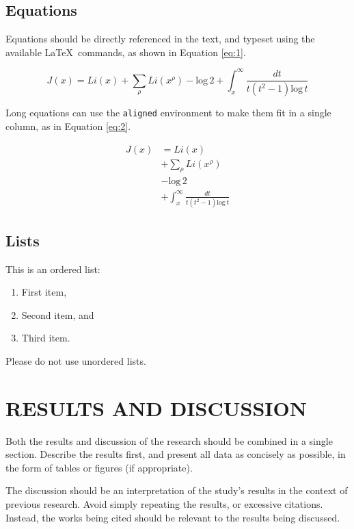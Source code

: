 \documentclass[twocolumn,twoside]{base/jrekpros}
\begin{document}
\subsection{Equations}

Equations should be directly referenced in the text, and typeset using the available \LaTeX\, commands, as shown in Equation \ref{eq:1}.

\begin{equation}
    J(x) = Li(x) + \sum_\rho Li(x^\rho) - \text{log}\,2 + \int^\infty_x \frac{dt}{t(t^2 - 1) \text{log}\,t}
    \label{eq:1}
\end{equation}

\noindent Long equations can use the \verb|aligned| environment to make them fit in a single column, as in Equation \ref{eq:2}.

\begin{equation}
    \begin{aligned}
        J(x) &= Li(x)\\ &+ \sum_\rho Li(x^\rho)\\ &- \text{log}\,2\\ &+ \int^\infty_x \frac{dt}{t(t^2 - 1) \text{log}\,t}
    \end{aligned}
    \label{eq:2}
\end{equation}

\subsection{Lists}

This is an ordered list:

\begin{enumerate}
    \item First item,
    \item Second item, and
    \item Third item.
\end{enumerate}

\noindent Please do not use unordered lists.

\section{RESULTS AND DISCUSSION}

Both the results and discussion of the research should be combined in a single section. Describe the results first, and present all data as concisely as possible, in the form of tables or figures (if appropriate). 

The discussion should be an interpretation of the study's results in the context of previous research. Avoid simply repeating the results, or excessive citations. Instead, the works being cited should be relevant to the results being discussed.
\end{document}
